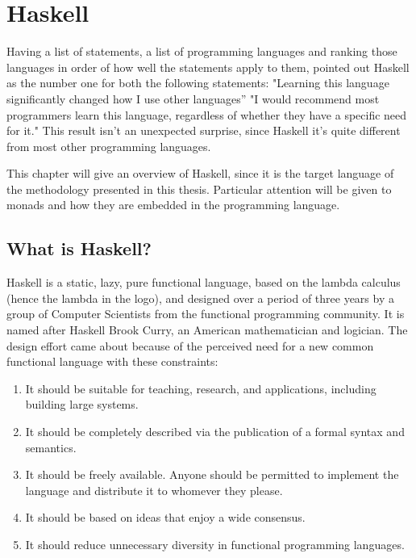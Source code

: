 \documentclass[target=mst,babel=\babelopt]{thud}[2014/01/17]
\begin{document}
\chapter{Haskell}

Having a list of statements, a list of programming languages and
ranking those languages in order of how well the statements apply to
them, pointed out Haskell as the number one for both the following
statements:
"Learning this language significantly changed how I use other languages''
\cite{interview1}
"I would recommend most programmers learn this language, regardless of
whether they have a specific need for it."
\cite{interview2}
This result isn't an unexpected surprise, since Haskell it's quite
different from most other programming languages. 

This chapter will give an overview of Haskell,
since it is the target language of the methodology
presented in this thesis. Particular attention will be given to monads
and how they are embedded in the programming language.


\section{What is Haskell?}
Haskell is a static, lazy, pure functional language,
 based on the lambda calculus (hence the lambda in the
logo), and designed over a period of three years by a group of
Computer Scientists from the functional programming community.
It is named after Haskell Brook Curry, an American mathematician and
logician. The design effort came about because of the perceived need
for a new common functional language with these constraints:
\begin{enumerate}
  \item It should be suitable for teaching, research, and
    applications, including building large systems.
    \item It should be completely described via the publication of a
      formal syntax and semantics.
      \item It should be freely available. Anyone should be permitted
        to implement the language and distribute it to whomever they
        please.
        \item It should be based on ideas that enjoy a wide consensus.
          \item It should reduce unnecessary diversity in functional programming languages.
\end{enumerate} \cite{haskell98}
\end{document}
